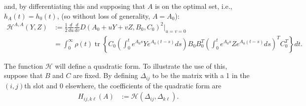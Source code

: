 \documentclass{article}
\newcommand{\tr}{\mathop{\mbox{tr}}} %
\newcommand{\calH}{\mathcal{H}}
\newcommand{\1}{\mathbbm{1}}
\begin{document}
and, by differentiating this and supposing that $A$ is on the optimal set,
i.e., $h_A(t)=h_0(t)$, (so without loss of generality, $A=A_0$):
\begin{equation}
  \begin{aligned}
      \calH^{A,A}(Y,Z) 
      &:= 
      \frac{1}{2} \frac{d}{du} \frac{d}{dv} D(A_0+uY+vZ,B_0,C_0)^2 \vert_{u=v=0} \\
      &=
        \int_0^\infty \rho(t) \tr\left\{ C_0 
        \left( \int_0^t e^{A_0 s} Y e^{A_0 (t-s)} ds \right) 
        B_0 B_0^T 
        \left( \int_0^t e^{A_0 s} Z e^{A_0 (t-s)} ds \right)^T
        C_0^T \right\} dt  .
  \end{aligned}
\end{equation}

The function $\calH$ will define a quadratic form.
To illustrate the use of this, suppose that $B$ and $C$ are fixed.
By defining $\Delta_{ij}$ to be the matrix with a 1 in the $(i,j)$th slot
and 0 elsewhere,
the coefficients of the quadratic form are
\begin{equation}
    \begin{aligned}
        H_{ij, k\ell}(A)
        &:=
        \calH(\Delta_{ij}, \Delta_{k\ell}) .
    \end{aligned}
\end{equation}
\end{document}
